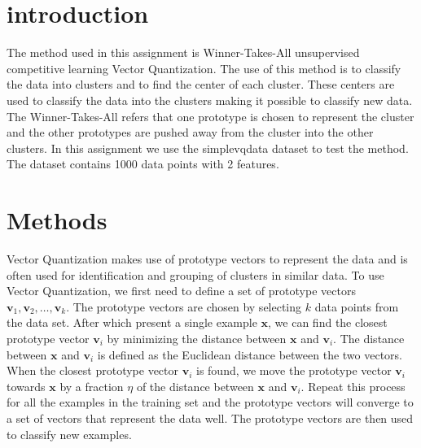 \documentclass[twoside, a4paper, fleqn, reqno]{article}
\begin{document}
\maketitle

\section{introduction}

The method used in this assignment is Winner-Takes-All unsupervised competitive learning Vector Quantization.
The use of this method is to classify the data into clusters and to find the center of each cluster.
These centers are used to classify the data into the clusters making it possible to classify new data.
The Winner-Takes-All refers that one prototype is chosen to represent the cluster and the other prototypes are pushed away from the cluster into the other clusters.
In this assignment we use the simplevqdata dataset to test the method.
The dataset contains 1000 data points with 2 features.

\section{Methods}

Vector Quantization makes use of prototype vectors to represent the data and is often used for identification and grouping of clusters in similar data.
To use Vector Quantization, we first need to define a set of prototype vectors $\mathbf{v}_1, \mathbf{v}_2, \ldots, \mathbf{v}_k$.
The prototype vectors are chosen by selecting $k$ data points from the data set.
After which present a single example $\mathbf{x}$, we can find the closest prototype vector $\mathbf{v}_i$ by minimizing the distance between $\mathbf{x}$ and $\mathbf{v}_i$.
The distance between $\mathbf{x}$ and $\mathbf{v}_i$ is defined as the Euclidean distance between the two vectors.
When the closest prototype vector $\mathbf{v}_i$ is found, we move the prototype vector $\mathbf{v}_i$ towards $\mathbf{x}$ by a fraction $\eta$ of the distance between $\mathbf{x}$ and $\mathbf{v}_i$.
Repeat this process for all the examples in the training set and the prototype vectors will converge to a set of vectors that represent the data well.
The prototype vectors are then used to classify new examples. \\
\end{document}
